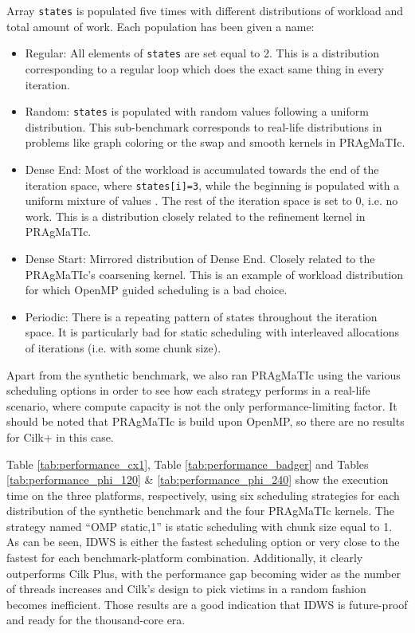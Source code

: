 \documentclass{acm_proc_article-sp}
\newcommand{\PRAGMATIC}{PRAgMaTIc\xspace}
\begin{document}
Array \texttt{states} is populated five times with different distributions of
workload and total amount of work. Each population has been given a name:
\begin{itemize}
\item Regular: All elements of \texttt{states} are set equal to 2. This is a
distribution corresponding to a regular loop which does the exact same thing in
every iteration.
\item Random: \texttt{states} is populated with random values following a uniform
distribution. This sub-benchmark corresponds to real-life distributions in
problems like graph coloring or the swap and smooth kernels in \PRAGMATIC.
\item Dense End: Most of the workload is accumulated towards the end of the
iteration space, where \texttt{states[i]=3}, while the beginning is populated
with a uniform mixture of values . The rest of the iteration space is
set to 0, i.e. no work. This is a distribution closely related to the refinement
kernel in \PRAGMATIC.
\item Dense Start: Mirrored distribution of Dense End. Closely related to the
\PRAGMATIC's coarsening kernel. This is an example of workload distribution for
which OpenMP guided scheduling is a bad choice.
\item Periodic: There is a repeating pattern of states throughout the iteration
space. It is particularly bad for static scheduling with interleaved allocations
of iterations (i.e. with some chunk size).
\end{itemize}

Apart from the synthetic benchmark, we also ran \PRAGMATIC using the various
scheduling options in order to see how each strategy performs in a real-life
scenario, where compute capacity is not the only performance-limiting factor. It
should be noted that \PRAGMATIC is build upon OpenMP, so there are no results
for Cilk+ in this case.

Table \ref{tab:performance_cx1}, Table \ref{tab:performance_badger} and
Tables \ref{tab:performance_phi_120} \& \ref{tab:performance_phi_240} show the
execution time on the three platforms, respectively, using six scheduling
strategies for each distribution of the synthetic benchmark and the four
\PRAGMATIC kernels. The strategy named ``OMP static,1'' is static scheduling
with chunk size equal to 1. As can be seen, IDWS is either the fastest
scheduling option or very close to the fastest for each benchmark-platform
combination. Additionally, it clearly outperforms Cilk Plus, with the
performance gap becoming wider as the number of threads increases and Cilk's
design to pick victims in a random fashion becomes inefficient. Those results
are a good indication that IDWS is future-proof and ready for the thousand-core
era.
\end{document}
